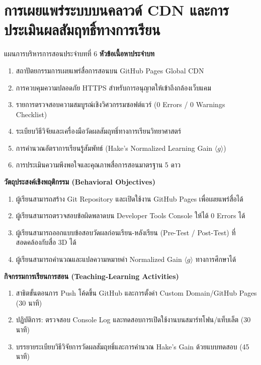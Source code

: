 \chapter{การเผยแพร่ระบบบนคลาวด์ CDN และการประเมินผลสัมฤทธิ์ทางการเรียน}
\label{chap:ch06}

\begin{teachingplan}{แผนการบริหารการสอนประจำบทที่ 6}
\noindent\textbf{หัวข้อเนื้อหาประจำบท}
\begin{enumerate}[leftmargin=1.5em, itemsep=2pt]
    \item สถาปัตยกรรมการเผยแพร่สื่อการสอนบน GitHub Pages Global CDN
    \item การควบคุมความปลอดภัย HTTPS สำหรับการอนุญาตให้เข้าถึงกล้องเว็บแคม
    \item รายการตรวจสอบความสมบูรณ์เชิงวิศวกรรมซอฟต์แวร์ (0 Errors / 0 Warnings Checklist)
    \item ระเบียบวิธีวิจัยและเครื่องมือวัดผลสัมฤทธิ์ทางการเรียนวิทยาศาสตร์
    \item การคำนวณอัตราการเรียนรู้สัมพัทธ์ (Hake's Normalized Learning Gain $\langle g \rangle$)
    \item การประเมินความพึงพอใจและคุณภาพสื่อการสอนมาตรฐาน 5 ดาว
\end{enumerate}

\noindent\textbf{วัตถุประสงค์เชิงพฤติกรรม (Behavioral Objectives)}
\begin{enumerate}[leftmargin=1.5em, itemsep=2pt]
    \item ผู้เรียนสามารถสร้าง Git Repository และเปิดใช้งาน GitHub Pages เพื่อเผยแพร่สื่อได้
    \item ผู้เรียนสามารถตรวจสอบข้อผิดพลาดบน Developer Tools Console ให้ได้ 0 Errors ได้
    \item ผู้เรียนสามารถออกแบบข้อสอบวัดผลก่อนเรียน-หลังเรียน (Pre-Test / Post-Test) ที่สอดคล้องกับสื่อ 3D ได้
    \item ผู้เรียนสามารถคำนวณและแปลความหมายค่า Normalized Gain $\langle g \rangle$ ทางการศึกษาได้
\end{enumerate}

\noindent\textbf{กิจกรรมการเรียนการสอน (Teaching-Learning Activities)}
\begin{enumerate}[leftmargin=1.5em, itemsep=2pt]
    \item สาธิตขั้นตอนการ Push โค้ดขึ้น GitHub และการตั้งค่า Custom Domain/GitHub Pages (30 นาที)
    \item ปฏิบัติการ: ตรวจสอบ Console Log และทดสอบการเปิดใช้งานบนสมาร์ทโฟน/แท็บเล็ต (30 นาที)
    \item บรรยายระเบียบวิธีวิจัยการวัดผลสัมฤทธิ์และการคำนวณ Hake's Gain ด้วยแบบทดสอบ (45 นาที)
\end{enumerate}


\end{teachingplan}
